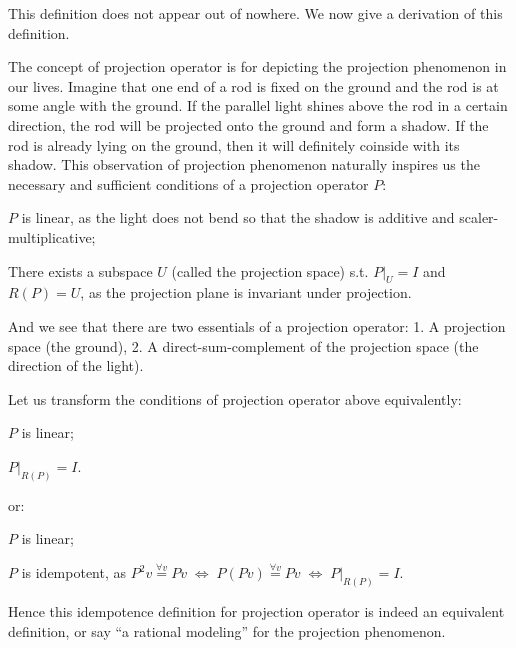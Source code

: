 \documentclass{article}
\begin{document}
\begin{Rmk}{}
    This definition does not appear out of nowhere. We now give a derivation of this definition. 

    The concept of projection operator is for depicting the projection phenomenon in our lives. Imagine that one end of a rod is fixed on the ground and the rod is at some angle with the ground. If the parallel light shines above the rod in a certain direction, the rod will be projected onto the ground and form a shadow. If the rod is already lying on the ground, then it will definitely coinside with its shadow. This observation of projection phenomenon naturally inspires us the necessary and sufficient conditions of a projection operator $P$:
    \begin{compactenum}
        \item \textcolor{Th}{$P$ is linear,} as the light does not bend so that the shadow is additive and scaler-multiplicative;
        \item \textcolor{Th}{There exists a subspace $U$ (called the projection space) s.t. $P|_U = I$ and $R(P) = U$,} as the projection plane is invariant under projection.
    \end{compactenum}
    And we see that there are two essentials of a projection operator: 1. A projection space (the ground), 2. A direct-sum-complement of the projection space (the direction of the light).

    Let us transform the conditions of projection operator above \textcolor{Th}{equivalently}:
    \begin{compactenum}
        \item \textcolor{Th}{$P$ is linear;}
        \item \textcolor{Th}{$P|_{R(P)} = I$.}
    \end{compactenum}
    or:
    \begin{compactenum}
        \item \textcolor{Th}{$P$ is linear;}
        \item \textcolor{Th}{$P$ is idempotent,} as $P^2v \overset{\forall v}{=} Pv \;\Leftrightarrow\; P(Pv) \overset{\forall v}{=} Pv \;\Leftrightarrow\; P|_{R(P)} = I$.
    \end{compactenum}
    Hence this idempotence definition for projection operator is indeed an equivalent definition, or say ``a rational modeling'' for the projection phenomenon.


\end{Rmk}
\end{document}
